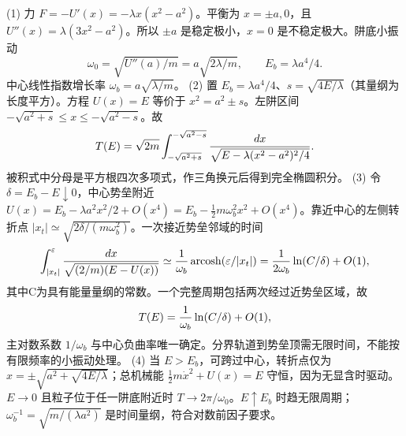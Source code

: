 (1) 力 \(F=-U'(x)=-\lambda x(x^2-a^2)\)。平衡为 \(x=\pm a,0\)，且 \(U''(x)=\lambda(3x^2-a^2)\)。所以 \(\pm a\) 是稳定极小，\(x=0\) 是不稳定极大。阱底小振动
\[
\omega_0=\sqrt{U''(a)/m}=a\sqrt{2\lambda/m},\qquad E_b=\lambda a^4/4.
\]
中心线性指数增长率 \(\omega_b=a\sqrt{\lambda/m}\)。
(2) 置 \(E_b=\lambda a^4/4\)、\(s=\sqrt{4E/\lambda}\)（其量纲为长度平方）。方程 \(U(x)=E\) 等价于 \(x^2=a^2\pm s\)。左阱区间 \(-\sqrt{a^2+s}\le x\le-\sqrt{a^2-s}\)。故
\[
T(E)=\sqrt{2m}\int_{-\sqrt{a^2+s}}^{-\sqrt{a^2-s}}
{dx\over\sqrt{E-\lambda(x^2-a^2)^2/4}}.
\]
被积式中分母是平方根四次多项式，作三角换元后得到完全椭圆积分。
(3) 令 \(\delta=E_b-E\downarrow0\)，中心势垒附近
\(U(x)=E_b-\lambda a^2x^2/2+O(x^4)=E_b-\frac12m\omega_b^2x^2+O(x^4)\)。靠近中心的左侧转折点 \(|x_t|\simeq\sqrt{2\delta/(m\omega_b^2)}\)。一次接近势垒邻域的时间
\[
\int_{|x_t|}^{\varepsilon}{dx\over\sqrt{(2/m)(E-U(x))}}
\simeq {1\over\omega_b}\operatorname{arcosh}(\varepsilon/|x_t|)
={1\over2\omega_b}\ln(C/\delta)+O(1),
\]
其中C为具有能量量纲的常数。一个完整周期包括两次经过近势垒区域，故
\[
T(E)={1\over\omega_b}\ln(C/\delta)+O(1),
\]
主对数系数 \(1/\omega_b\) 与中心负曲率唯一确定。分界轨道到势垒顶需无限时间，不能按有限频率的小振动处理。
(4) 当 \(E>E_b\)，可跨过中心，转折点仅为 \(x=\pm\sqrt{a^2+\sqrt{4E/\lambda}}\)；总机械能 \(\frac12m\dot x^2+U(x)=E\) 守恒，因为无显含时驱动。\(E\to0\) 且粒子位于任一阱底附近时 \(T\to2\pi/\omega_0\)。\(E\uparrow E_b\) 时趋无限周期；\(\omega_b^{-1}=\sqrt{m/(\lambda a^2)}\) 是时间量纲，符合对数前因子要求。
